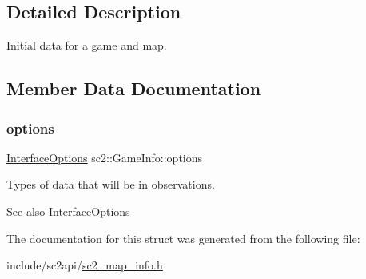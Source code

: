 \subsection{Detailed Description}
Initial data for a game and map. 

\subsection{Member Data Documentation}
\mbox{\label{structsc2_1_1_game_info_a44cd71a765e383ef257e75ead9839d1c}} 
\subsubsection{\texorpdfstring{options}{options}}
{\footnotesize\ttfamily \hyperlink{structsc2_1_1_interface_options}{Interface\+Options} sc2\+::\+Game\+Info\+::options}

Types of data that will be in observations. \begin{DoxySeeAlso}{See also}
\hyperlink{structsc2_1_1_interface_options}{Interface\+Options} 
\end{DoxySeeAlso}


The documentation for this struct was generated from the following file\+:\begin{DoxyCompactItemize}
\item 
include/sc2api/\hyperlink{sc2__map__info_8h}{sc2\+\_\+map\+\_\+info.\+h}\end{DoxyCompactItemize}
